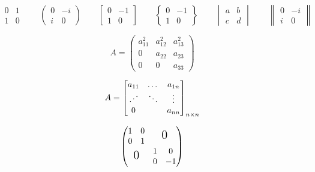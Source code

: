 \documentclass{ctexart}
\newcommand{\adots}{\mathinner{\mkern2mu%
			\raisebox{0.1em}{.}\mkern2mu\raisebox{0.4em}{.}%
			\mkern2mu\raisebox{0.7em}{.}\mkern1mu}}
\begin{document}
	\[
	\begin{matrix}
		0 & 1\\
		1 & 0	
	\end{matrix} \qquad
	\begin{pmatrix}
		0 & -i \\
		i & 0	
	\end{pmatrix}  \qquad
	\begin{bmatrix}
		0 & -1 \\
		1 & 0
	\end{bmatrix} \qquad
	\begin{Bmatrix}
		0 & -1 \\
		1 & 0
	\end{Bmatrix} \qquad
	\begin{vmatrix} 
		a & b \\
		c & d
	\end{vmatrix} \qquad
	\begin{Vmatrix} 
		0 & -i \\
		i & 0
	\end{Vmatrix} \qquad
	\]
	
	\[
	A = \begin{pmatrix}
	a_{11}^2 & a_{12}^2 & a_{13}^2\\
	0 & a_{22} & a_{23}\\
	0 & 0 & a_{33}
	\end{pmatrix}
	\]
	
	\[
	A = \begin{bmatrix}
	a_{11} & \dots & a_{1n}\\
	\adots & \ddots & \vdots\\
	0 & & a_{nn}
	\end{bmatrix}_{n \times n} %
	\]
	
	\[
	\begin{pmatrix}
	\begin{matrix} 	1 & 0\\	0 & 1	\end{matrix}	& \text{\Large 0} \\
	\text{\Large 0} & \begin{matrix} 1 & 0\\ 0 & -1	\end{matrix}
	\end{pmatrix}
	\]
		
\end{document}
